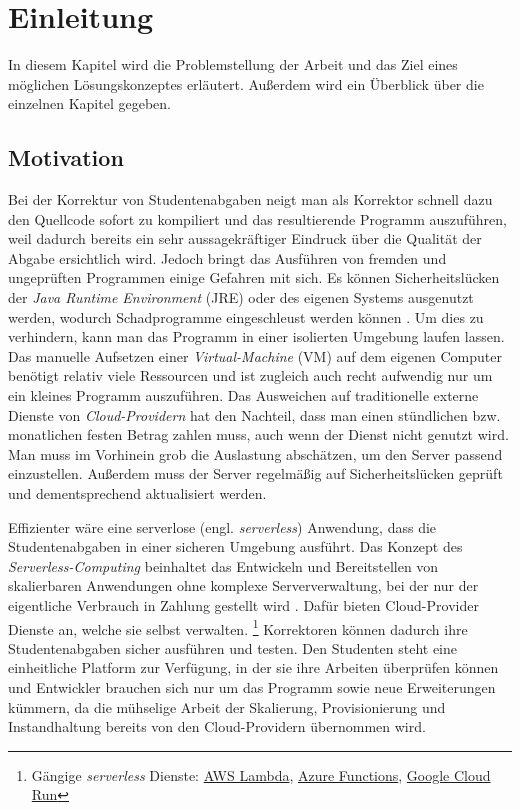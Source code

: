 \chapter{Einleitung}
In diesem Kapitel wird die Problemstellung der Arbeit und das Ziel eines möglichen Lösungskonzeptes
erläutert. Außerdem wird ein Überblick über die einzelnen Kapitel gegeben.

\section{Motivation}
Bei der Korrektur von Studentenabgaben neigt man als Korrektor schnell dazu den Quellcode sofort zu kompiliert und das resultierende Programm auszuführen, weil dadurch bereits ein sehr aussagekräftiger Eindruck über die Qualität der Abgabe ersichtlich wird. Jedoch bringt das Ausführen von fremden und ungeprüften Programmen einige Gefahren mit sich.
Es können Sicherheitslücken der \textit{Java Runtime Environment} (JRE) \cite{Jre}
oder des eigenen Systems ausgenutzt werden, wodurch Schadprogramme eingeschleust
werden können \cite{CveJreVuln}.
Um dies zu verhindern, kann man das Programm in einer isolierten Umgebung laufen lassen.
Das manuelle Aufsetzen einer \textit{Virtual-Machine} (VM) \cite{RedHatVM} auf dem eigenen Computer benötigt relativ
viele Ressourcen und ist zugleich auch recht aufwendig nur um ein kleines Programm auszuführen.
Das Ausweichen auf traditionelle externe Dienste von \textit{Cloud-Providern} hat den Nachteil, dass man einen stündlichen bzw. monatlichen festen Betrag zahlen muss, auch wenn der Dienst nicht genutzt wird. Man muss im Vorhinein grob die Auslastung abschätzen, um den Server passend einzustellen. Außerdem muss der Server regelmäßig auf Sicherheitslücken geprüft und dementsprechend aktualisiert werden.

Effizienter wäre eine serverlose (engl. \textit{serverless}) Anwendung, dass die Studentenabgaben in einer sicheren Umgebung ausführt.
Das Konzept des \textit{Serverless-Computing} beinhaltet das Entwickeln und Bereitstellen
von skalierbaren Anwendungen ohne komplexe Serververwaltung, bei der nur der eigentliche Verbrauch
in Zahlung gestellt wird \cite{CioGov}.
Dafür bieten Cloud-Provider Dienste an, welche sie selbst verwalten.
\footnote{
  Gängige \textit{serverless} Dienste:
  {\href{https://aws.amazon.com/de/lambda/}{AWS Lambda}},
  {\href{https://azure.microsoft.com/de-de/services/functions/}{Azure Functions}},
  {\href{https://cloud.google.com/run?hl=de}{Google Cloud Run}}
}
Korrektoren können dadurch ihre Studentenabgaben sicher ausführen und testen.
Den Studenten steht eine einheitliche Platform zur Verfügung, in der sie ihre Arbeiten überprüfen können und
Entwickler brauchen sich nur um das Programm sowie neue Erweiterungen kümmern, da die mühselige Arbeit
der Skalierung, Provisionierung und Instandhaltung bereits von den Cloud-Providern übernommen wird.

